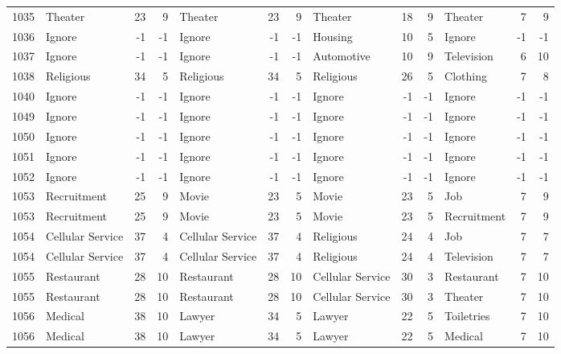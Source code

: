 \begin{figure}[htbp]
\begin{tabular}{rlrrlrrlrrlrr}
    1035  & Theater & 23    & 9     & Theater & 23    & 9     & Theater & 18    & 9     & Theater & 7     & 9 \\
    1036  & Ignore & -1    & -1    & Ignore & -1    & -1    & Housing & 10    & 5     & Ignore & -1    & -1 \\
    1037  & Ignore & -1    & -1    & Ignore & -1    & -1    & Automotive & 10    & 9     & Television & 6     & 10 \\
    1038  & Religious & 34    & 5     & Religious & 34    & 5     & Religious & 26    & 5     & Clothing & 7     & 8 \\
    1040  & Ignore & -1    & -1    & Ignore & -1    & -1    & Ignore & -1    & -1    & Ignore & -1    & -1 \\
    1049  & Ignore & -1    & -1    & Ignore & -1    & -1    & Ignore & -1    & -1    & Ignore & -1    & -1 \\
    1050  & Ignore & -1    & -1    & Ignore & -1    & -1    & Ignore & -1    & -1    & Ignore & -1    & -1 \\
    1051  & Ignore & -1    & -1    & Ignore & -1    & -1    & Ignore & -1    & -1    & Ignore & -1    & -1 \\
    1052  & Ignore & -1    & -1    & Ignore & -1    & -1    & Ignore & -1    & -1    & Ignore & -1    & -1 \\
    1053  & Recruitment & 25    & 9     & Movie & 23    & 5     & Movie & 23    & 5     & Job   & 7     & 9 \\
    1053  & Recruitment & 25    & 9     & Movie & 23    & 5     & Movie & 23    & 5     & Recruitment & 7     & 9 \\
    1054  & Cellular Service & 37    & 4     & Cellular Service & 37    & 4     & Religious & 24    & 4     & Job   & 7     & 7 \\
    1054  & Cellular Service & 37    & 4     & Cellular Service & 37    & 4     & Religious & 24    & 4     & Television & 7     & 7 \\
    1055  & Restaurant & 28    & 10    & Restaurant & 28    & 10    & Cellular Service & 30    & 3     & Restaurant & 7     & 10 \\
    1055  & Restaurant & 28    & 10    & Restaurant & 28    & 10    & Cellular Service & 30    & 3     & Theater & 7     & 10 \\
    1056  & Medical & 38    & 10    & Lawyer & 34    & 5     & Lawyer & 22    & 5     & Toiletries & 7     & 10 \\
    1056  & Medical & 38    & 10    & Lawyer & 34    & 5     & Lawyer & 22    & 5     & Medical & 7     & 10 \\

\end{tabular}
\end{figure}
